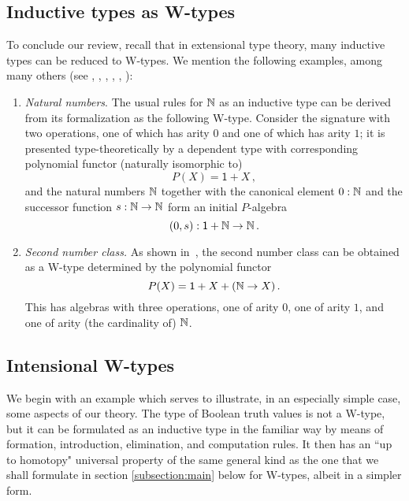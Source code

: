 \subsection{Inductive types as W-types}

\noindent To conclude our review, recall that in extensional type theory, many inductive types can be reduced to W-types.  We mention the following  examples, among many others (see \cite{MartinLofP:inttt}, \cite{DybjerP:repids}, \cite{GoguenH:inddtw}, \cite{MoerdijkI:weltc}, \cite{GambinoN:weltdp}, \cite{AbbottM:concsp}):
\begin{enumerate}
\item \emph{Natural numbers}. \label{extnatW}
The usual rules for $\mathbb{N}$ as an inductive type can be derived from its formalization as the following W-type. Consider the signature with two operations, one of which has arity $0$ and one of which has arity $1$; it is presented type-theoretically by a dependent type with corresponding polynomial functor (naturally isomorphic to)
\[
P(X) = \mathsf{1} + X \, ,
\]
%
and the natural numbers $\mathbb{N}$ together with the canonical element $0:\mathbb{N}$ and the successor function $s : \mathbb{N}\rightarrow\mathbb{N}$ form an initial $P$-algebra
\[
(0, s) : \mathsf{1} + \mathbb{N} \rightarrow \mathbb{N}\, .
\]
%
\item \emph{Second number class.}
As shown in~\cite{MartinLofP:inttt}, the second number class can be obtained as a W-type determined by the polynomial functor 
\[
P(X) = \mathsf{1} + X + (\mathbb{N} \rightarrow X) \, .
\]
This has algebras with three operations, one of arity $0$, one of arity $1$, and one of arity (the cardinality of) $\mathbb{N}$.
%
\end{enumerate}

\smallskip

\subsection{Intensional W-types}\label{section:intW}

\noindent We begin with an example which serves to illustrate, in an especially simple case, some aspects of our theory.  The type of Boolean truth values is not a W-type, but it can be formulated as an inductive type in the familiar way by means of  formation, introduction, elimination, and computation rules.  It then has an ``up to homotopy" universal property of the same general kind as the one that we shall formulate in section \ref{subsection:main} below for W-types, albeit in a simpler form.

